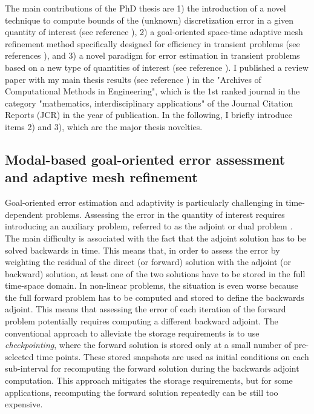 \documentclass{article}
\newcommand{\bemph}[1]{#1}
\begin{document}
The main contributions of the PhD thesis are 1) the introduction of a novel technique to compute bounds of the (unknown) discretization error in a given quantity of interest (see reference \cite{verdugo_2012}), 2) a goal-oriented space-time adaptive mesh refinement method specifically designed for efficiency in transient problems (see references \cite{casadei_2013}\cite{verdugo_2014a}), and 3)  a novel paradigm for error estimation in transient problems based on a new type of quantities of interest (see reference \cite{verdugo_2013}). I published a review paper with my main thesis results (see reference \cite{verdugo_error_2014}) in the "Archives of Computational Methods in Engineering", which is the \bemph{1st ranked journal} in the category "mathematics, interdisciplinary applications" of the Journal Citation Reports (JCR) in the year of publication. In the following, I briefly introduce items 2) and 3), which are the major thesis novelties.

\subsection{Modal-based goal-oriented error assessment and adaptive mesh refinement}

Goal-oriented error estimation and adaptivity is particularly challenging in time-dependent problems. Assessing the error in the quantity of interest requires introducing an auxiliary problem, referred to as the adjoint or dual problem \cite{becker_2001}. The main difficulty is associated with the fact that the adjoint solution has to be solved backwards in time. This means that, in order to assess the error by weighting the residual of the direct (or forward) solution with the adjoint (or backward) solution, at least one of the two solutions have to be stored in the full time-space domain. In non-linear problems, the situation is even worse because the full forward problem has to be computed and stored to define the backwards adjoint. This means that assessing the error of each iteration of the forward problem potentially requires computing a different backward adjoint. The conventional approach to alleviate the storage requirements is to use \emph{checkpointing}, where the forward solution is stored only at a small number of pre-selected time points. These stored snapshots are used  as initial conditions on each sub-interval for recomputing the forward solution during the backwards adjoint computation. This approach mitigates the storage requirements, but for some applications, recomputing the forward solution repeatedly can be still too expensive.
\end{document}
